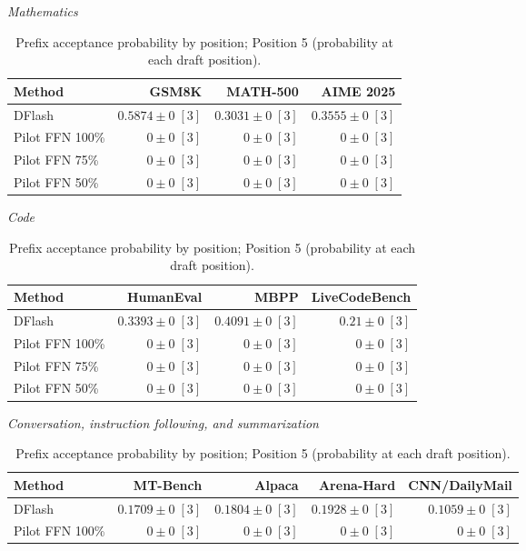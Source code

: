 \begin{table}[!htp]
\centering\small
\setlength{\tabcolsep}{3pt}
\caption{Prefix acceptance probability by position; Position 5 (probability at each draft position).}
\label{tab:appendix-metric-prefix-survival-5}
\textit{Mathematics}\par\smallskip
\begin{tabular}{@{}>{\raggedright\arraybackslash}p{3.7cm}rrr@{}}
\toprule
Method & GSM8K & MATH-500 & AIME 2025 \\
\midrule
DFlash & \(\mathbf{0.5874} \pm 0\;[3]\) & \(\mathbf{0.3031} \pm 0\;[3]\) & \(\mathbf{0.3555} \pm 0\;[3]\) \\
Pilot FFN 100\% & \(0 \pm 0\;[3]\) & \(0 \pm 0\;[3]\) & \(0 \pm 0\;[3]\) \\
Pilot FFN 75\% & \(0 \pm 0\;[3]\) & \(0 \pm 0\;[3]\) & \(0 \pm 0\;[3]\) \\
Pilot FFN 50\% & \(0 \pm 0\;[3]\) & \(0 \pm 0\;[3]\) & \(0 \pm 0\;[3]\) \\
\bottomrule
\end{tabular}\par\medskip
\textit{Code}\par\smallskip
\begin{tabular}{@{}>{\raggedright\arraybackslash}p{3.7cm}rrr@{}}
\toprule
Method & HumanEval & MBPP & LiveCodeBench \\
\midrule
DFlash & \(\mathbf{0.3393} \pm 0\;[3]\) & \(\mathbf{0.4091} \pm 0\;[3]\) & \(\mathbf{0.21} \pm 0\;[3]\) \\
Pilot FFN 100\% & \(0 \pm 0\;[3]\) & \(0 \pm 0\;[3]\) & \(0 \pm 0\;[3]\) \\
Pilot FFN 75\% & \(0 \pm 0\;[3]\) & \(0 \pm 0\;[3]\) & \(0 \pm 0\;[3]\) \\
Pilot FFN 50\% & \(0 \pm 0\;[3]\) & \(0 \pm 0\;[3]\) & \(0 \pm 0\;[3]\) \\
\bottomrule
\end{tabular}\par\medskip
\textit{Conversation, instruction following, and summarization}\par\smallskip
\begin{tabular}{@{}>{\raggedright\arraybackslash}p{3.7cm}rrrr@{}}
\toprule
Method & MT-Bench & Alpaca & Arena-Hard & CNN/DailyMail \\
\midrule
DFlash & \(\mathbf{0.1709} \pm 0\;[3]\) & \(\mathbf{0.1804} \pm 0\;[3]\) & \(\mathbf{0.1928} \pm 0\;[3]\) & \(\mathbf{0.1059} \pm 0\;[3]\) \\
Pilot FFN 100\% & \(0 \pm 0\;[3]\) & \(0 \pm 0\;[3]\) & \(0 \pm 0\;[3]\) & \(0 \pm 0\;[3]\) \\

\end{tabular}
\end{table}
